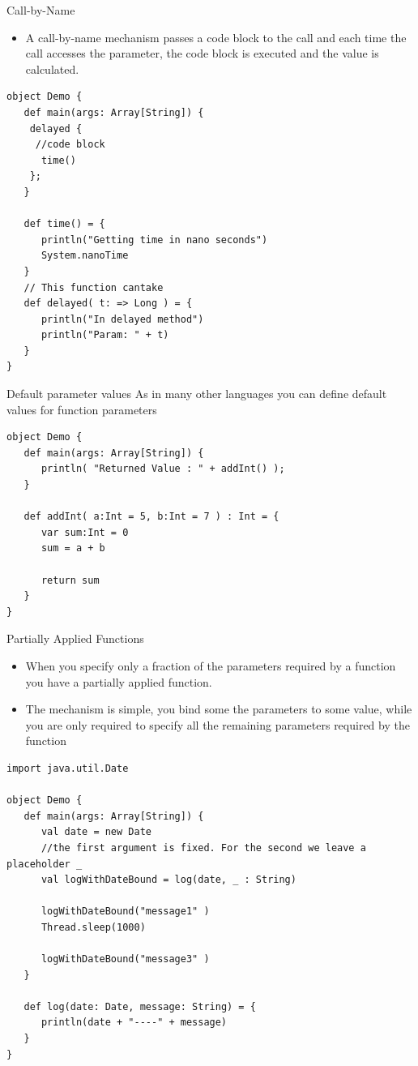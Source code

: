 \documentclass[presentation, aspectratio=169]{beamer}
\begin{document}
\begin{frame}[label={sec:org2f7ddd5},fragile]{Call-by-Name}
 \begin{itemize}
\item A call-by-name mechanism passes a code block to the call
and each time the call accesses the parameter, the code block is executed 
and the value is calculated.
\end{itemize}

\begin{verbatim}
object Demo {
   def main(args: Array[String]) {
	delayed {
	 //code block
	  time()
	};
   }

   def time() = {
      println("Getting time in nano seconds")
      System.nanoTime
   }
   // This function cantake 
   def delayed( t: => Long ) = {
      println("In delayed method")
      println("Param: " + t)
   }
}
\end{verbatim}
\end{frame}

\begin{frame}[label={sec:org8c8e821},fragile]{Default parameter values}
 As in many other languages you can define default values for function parameters
\begin{verbatim}
object Demo {
   def main(args: Array[String]) {
      println( "Returned Value : " + addInt() );
   }

   def addInt( a:Int = 5, b:Int = 7 ) : Int = {
      var sum:Int = 0
      sum = a + b

      return sum
   }
}
\end{verbatim}
\end{frame}

\begin{frame}[label={sec:orge5d1910},fragile]{Partially Applied Functions}
 \begin{itemize}
\item When you specify only a fraction of the parameters required by a function you
have a partially applied function.

\item The mechanism is simple, you bind some the parameters to some value, while you are only required to specify
all the remaining parameters required by the function
\end{itemize}

\begin{verbatim}
import java.util.Date

object Demo {
   def main(args: Array[String]) {
      val date = new Date
      //the first argument is fixed. For the second we leave a placeholder _
      val logWithDateBound = log(date, _ : String)

      logWithDateBound("message1" )
      Thread.sleep(1000)

      logWithDateBound("message3" )
   }

   def log(date: Date, message: String) = {
      println(date + "----" + message)
   }
}
\end{verbatim}
\end{frame}
\end{document}
